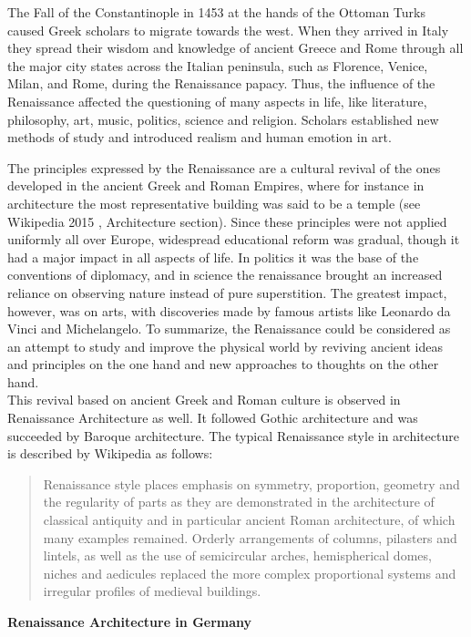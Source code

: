 The Fall of the Constantinople in 1453 at the hands of the Ottoman Turks caused Greek scholars to migrate towards the west. When they arrived in Italy they spread their wisdom and knowledge of ancient Greece and Rome through all the major city states across the Italian peninsula, such as Florence, Venice, Milan, and Rome, during the Renaissance papacy. Thus, the influence of the Renaissance affected the questioning of many aspects in life, like literature, philosophy, art, music, politics, science and religion. Scholars established new methods of study and introduced realism and human emotion in art. 

The principles expressed by the Renaissance are a cultural revival of the ones developed in the ancient Greek and Roman Empires, where for instance in architecture the most representative building was said to be a temple (see Wikipedia 2015 \parencite{wiki:Ancient_greek_roman_principles}, Architecture section). Since these principles were not applied uniformly all over Europe, widespread educational reform was gradual, though it had a major impact in all aspects of life. In politics it was the base of the conventions of diplomacy, and in science the renaissance brought an increased reliance on observing nature instead of pure superstition. The greatest impact, however, was on arts, with discoveries made by famous artists like Leonardo da Vinci and Michelangelo. To summarize, the Renaissance could be considered as an attempt to study and improve the physical world by reviving ancient ideas and principles on the one hand and new approaches to thoughts on the other hand.\\

This revival based on ancient Greek and Roman culture is observed in Renaissance Architecture as well. It followed Gothic architecture and was succeeded by Baroque architecture. The typical Renaissance style in architecture is described by Wikipedia \parencite{wiki:Renaissance} as follows:

\blockquote{
	Renaissance style places emphasis on symmetry, proportion, geometry and the regularity of parts as they are demonstrated in the architecture of classical antiquity and in particular ancient Roman architecture, of which many examples remained. Orderly arrangements of columns, pilasters and lintels, as well as the use of semicircular arches, hemispherical domes, niches and aedicules replaced the more complex proportional systems and irregular profiles of medieval buildings.	
}

\textbf{Renaissance Architecture in Germany}\\

